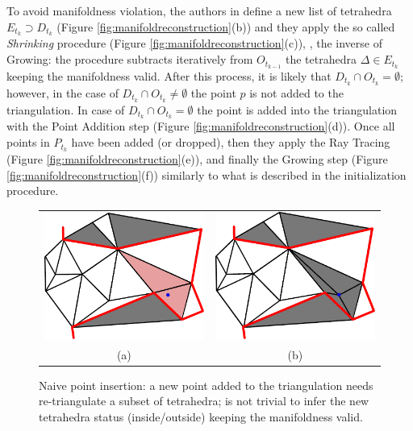 To avoid manifoldness violation, the authors in \cite{litvinov_lhuillier_13} define a new list of tetrahedra $E_{t_k} \supset D_{t_k}$ (Figure \ref{fig:manifoldreconstruction}(b)) and they apply the so called \emph{Shrinking} procedure (Figure \ref{fig:manifoldreconstruction}(c)), \ie, the inverse of Growing: the procedure subtracts iteratively from $O_{t_{k-1}}$ the tetrahedra  $\Delta \in E_{t_k}$ keeping the manifoldness valid.
After this process, it is likely that $D_{t_k} \cap O_{t_k} = \emptyset$; however, in the case of $D_{t_k} \cap O_{t_k} \neq \emptyset$ the point $p$ is not added to the triangulation.
In case of $D_{t_k} \cap O_{t_k} = \emptyset$ the point is added into the triangulation with the Point Addition step (Figure \ref{fig:manifoldreconstruction}(d)). 
Once all points in $P_{t_k}$ have been added (or dropped), then they apply the Ray Tracing  (Figure \ref{fig:manifoldreconstruction}(e)), and finally the Growing step (Figure \ref{fig:manifoldreconstruction}(f)) similarly to what is described in the initialization procedure.


\begin{figure}[tp]
\centering
 \begin{tabular}{cc}
  \includegraphics[width=0.45\columnwidth]{./img/ch_soa/pointIns01}&
  \includegraphics[width=0.45\columnwidth]{./img/ch_soa/pointIns02}\\
  (a)&(b)
 \end{tabular}
 \caption{Naive point insertion: a new point added to the triangulation needs re-triangulate a subset of tetrahedra; is not trivial to infer the new tetrahedra status (inside/outside) keeping the manifoldness valid.}
 \label{fig:insertion}
\end{figure}



